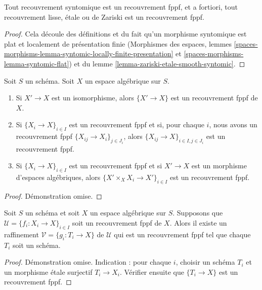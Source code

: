 \begin{lemma}
\label{lemma-zariski-etale-smooth-syntomic-fppf}
Tout recouvrement syntomique est un recouvrement fppf, et a fortiori,
tout recouvrement lisse, \'etale ou de Zariski est un recouvrement fppf.
\end{lemma}

\begin{proof}
Cela découle des définitions et du fait qu'un morphisme syntomique
est plat et localement de présentation finie
(Morphismes des espaces, lemmes
\ref{spaces-morphisms-lemma-syntomic-locally-finite-presentation} et
\ref{spaces-morphisms-lemma-syntomic-flat}) et
du lemme \ref{lemma-zariski-etale-smooth-syntomic}.
\end{proof}

\begin{lemma}
\label{lemma-fppf}
Soit $S$ un schéma.
Soit $X$ un espace algébrique sur $S$.
\begin{enumerate}
\item Si $X' \to X$ est un isomorphisme, alors $\{X' \to X\}$
est un recouvrement fppf de $X$.
\item Si $\{X_i \to X\}_{i\in I}$ est un recouvrement fppf et si, pour chaque
$i$, nous avons un recouvrement fppf $\{X_{ij} \to X_i\}_{j\in J_i}$, alors
$\{X_{ij} \to X\}_{i \in I, j\in J_i}$ est un recouvrement fppf.
\item Si $\{X_i \to X\}_{i\in I}$ est un recouvrement fppf
et si $X' \to X$ est un morphisme d'espaces algébriques, alors
$\{X' \times_X X_i \to X'\}_{i\in I}$ est un recouvrement fppf.
\end{enumerate}
\end{lemma}

\begin{proof}
Démonstration omise.
\end{proof}

\begin{lemma}
\label{lemma-refine-fppf-schemes}
Soit $S$ un schéma et soit $X$ un espace algébrique sur $S$.
Supposons que $\mathcal{U} = \{f_i : X_i \to X\}_{i \in I}$ soit un
recouvrement fppf de $X$. Alors il existe un raffinement
$\mathcal{V} = \{g_i : T_i \to X\}$ de $\mathcal{U}$ qui est un
recouvrement fppf tel que chaque $T_i$ soit un schéma.
\end{lemma}

\begin{proof}
Démonstration omise. Indication : pour chaque $i$, choisir un schéma $T_i$ et un morphisme \'etale surjectif
$T_i \to X_i$. Vérifier ensuite que $\{T_i \to X\}$ est un recouvrement fppf.
\end{proof}


